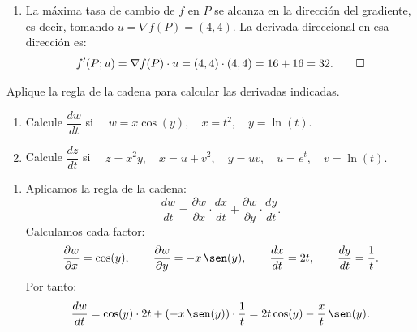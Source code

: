 \documentclass[10pt,a5]{aleph-examen}
\begin{document}
\begin{preguntas}
\begin{respuesta}
\begin{enumerate}
    \item La máxima tasa de cambio de $f$ en $P$ se alcanza en la dirección del gradiente, es decir, tomando $u=\nabla f(P)=(4,4)$. La derivada direccional en esa dirección es:
    \[
        f'(P;u)
        =
        \nabla f(P)\cdot u
        =
        (4,4)\cdot(4,4)
        =
        16+16
        =
        32.\qedhere
    \]
\end{enumerate}
\end{respuesta}


\item
Aplique la regla de la cadena para calcular las derivadas indicadas.
\begin{enumerate}[leftmargin=*]
    \item Calcule $\dfrac{dw}{dt}$ si
    $\quad
        w=x\cos(y),
        \quad
        x=t^2,
        \quad
        y=\ln(t).
    $

    \item Calcule $\dfrac{dz}{dt}$ si
    $
        \quad
        z=x^2y,
        \quad
        x=u+v^2,
        \quad
        y=uv,
        \quad
        u=e^t,
        \quad
        v=\ln(t).
    $
\end{enumerate}

\begin{respuesta}
\begin{enumerate}
    \item Aplicamos la regla de la cadena:
    \[
        \frac{dw}{dt}
        =
        \frac{\partial w}{\partial x}\cdot\frac{dx}{dt}
        +
        \frac{\partial w}{\partial y}\cdot\frac{dy}{dt}.
    \]
    Calculamos cada factor:
    \[
        \frac{\partial w}{\partial x}=\cos(y),\qquad
        \frac{\partial w}{\partial y}=-x\,\sen(y),\qquad
        \frac{dx}{dt}=2t,\qquad
        \frac{dy}{dt}=\frac{1}{t}.
    \]
    Por tanto:
    \[
        \frac{dw}{dt}
        =
        \cos(y)\cdot 2t + (-x\,\sen(y))\cdot\frac{1}{t}
        =
        2t\cos(y)-\frac{x}{t}\,\sen(y).
    \]


\end{enumerate}
\end{respuesta}
\end{preguntas}
\end{document}
